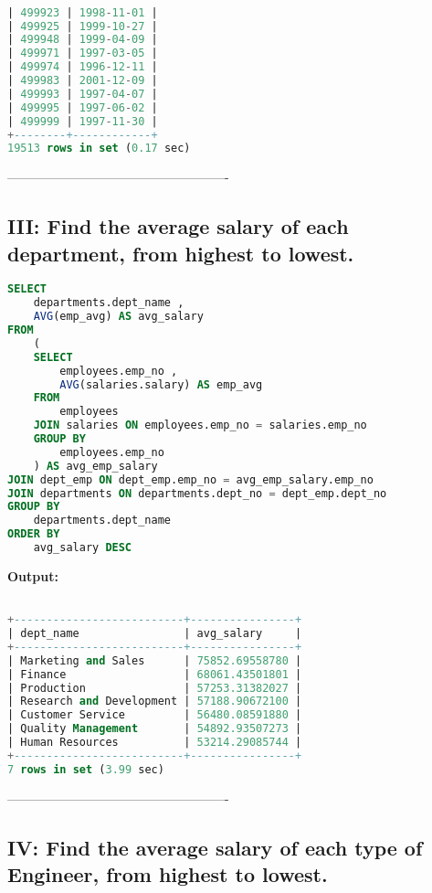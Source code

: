 \documentclass[12pt]{report}
\begin{document}
\begin{lstlisting}[language=sql]

| 499923 | 1998-11-01 |
| 499925 | 1999-10-27 |
| 499948 | 1999-04-09 |
| 499971 | 1997-03-05 |
| 499974 | 1996-12-11 |
| 499983 | 2001-12-09 |
| 499993 | 1997-04-07 |
| 499995 | 1997-06-02 |
| 499999 | 1997-11-30 |
+--------+------------+
19513 rows in set (0.17 sec)

\end{lstlisting}
----------------------------------------------------


\subsection*{III: Find the average salary of each department, from highest to lowest.}

\begin{lstlisting}[language=sql]
SELECT
	departments.dept_name ,
	AVG(emp_avg) AS avg_salary
FROM
	(
	SELECT
		employees.emp_no ,
		AVG(salaries.salary) AS emp_avg
	FROM
		employees
	JOIN salaries ON employees.emp_no = salaries.emp_no
	GROUP BY
		employees.emp_no
	) AS avg_emp_salary
JOIN dept_emp ON dept_emp.emp_no = avg_emp_salary.emp_no
JOIN departments ON departments.dept_no = dept_emp.dept_no
GROUP BY
	departments.dept_name
ORDER BY
	avg_salary DESC
\end{lstlisting}


\textbf{Output:}
\begin{lstlisting}[language=sql]

+--------------------------+----------------+
| dept_name                | avg_salary     |
+--------------------------+----------------+
| Marketing and Sales      | 75852.69558780 |
| Finance                  | 68061.43501801 |
| Production               | 57253.31382027 |
| Research and Development | 57188.90672100 |
| Customer Service         | 56480.08591880 |
| Quality Management       | 54892.93507273 |
| Human Resources          | 53214.29085744 |
+--------------------------+----------------+
7 rows in set (3.99 sec)

\end{lstlisting}
----------------------------------------------------

\subsection*{IV: Find the average salary of each type of Engineer, from highest to lowest.}
\end{document}
